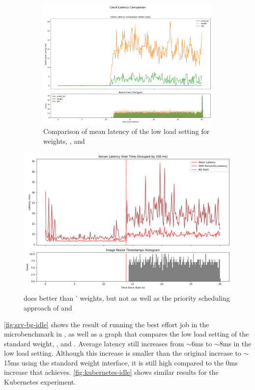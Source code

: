 \begin{figure}[t]
\begin{subfigure}[t]{\columnwidth}
        \includegraphics[width=\columnwidth]{graphs/srv-bg-cmp-all.png}
        \caption{Comparison of mean latency of the low load setting for weights,
        \schedidle{}, and \schedbe{}}\label{fig:srv-bg-cmp}
    \end{subfigure}
    \vspace{4pt}
    \caption{}\label{fig:srv-bg-idle}
\end{figure}

\begin{figure}[t]
    \centering
    \includegraphics[width=\columnwidth]{graphs/kubernetes-idle.png}
    \caption{ \schedidle{} does better than \cgroups{}' weights, but not as well
    as the priority scheduling approach of \rtclass{} and \schedbe{}
    }\label{fig:kubernetes-idle}
\end{figure}

\autoref{fig:srv-bg-idle} shows the result of running the best effort job in the
microbenchmark in \schedidle{}, as well as a graph that compares the low load
setting of the standard \cgroups{} weight, \schedbe{}, and \schedidle{}. Average
latency still increases from $\sim$6ms to $\sim$8ms in the low load setting.
Although this increase is smaller than the original increase to $\sim$15ms using
the standard weight interface, it is still high compared to the 0ms increase
that \schedbe{} achieves. \autoref{fig:kubernetes-idle} shows similar results
for the Kubernetes experiment.